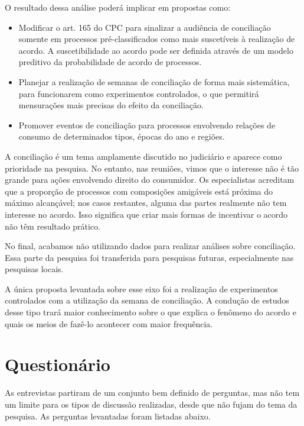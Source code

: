 \documentclass[]{report}
\providecommand{\tightlist}{%
  \setlength{\itemsep}{0pt}\setlength{\parskip}{0pt}}
\begin{document}
O resultado dessa análise poderá implicar em propostas como:

\begin{itemize}
\tightlist
\item
  Modificar o art. 165 do CPC para sinalizar a audiência de conciliação
  somente em processos pré-classificados como mais suscetíveis à
  realização de acordo. A suscetibilidade ao acordo pode ser definida
  através de um modelo preditivo da probabilidade de acordo de
  processos.
\item
  Planejar a realização de semanas de conciliação de forma mais
  sistemática, para funcionarem como experimentos controlados, o que
  permitirá mensurações mais precisas do efeito da conciliação.
\item
  Promover eventos de conciliação para processos envolvendo relações de
  consumo de determinados tipos, épocas do ano e regiões.
\end{itemize}

A conciliação é um tema amplamente discutido no judiciário e aparece
como prioridade na pesquisa. No entanto, nas reuniões, vimos que o
interesse não é tão grande para ações envolvendo direito do consumidor.
Os especialistas acreditam que a proporção de processos com composições
amigáveis está próxima do máximo alcançável; nos casos restantes, alguma
das partes realmente não tem interesse no acordo. Isso significa que
criar mais formas de incentivar o acordo não têm resultado prático.

No final, acabamos não utilizando dados para realizar análises sobre
conciliação. Essa parte da pesquisa foi transferida para pesquisas
futuras, especialmente nas pesquisas locais.

A única proposta levantada sobre esse eixo foi a realização de
experimentos controlados com a utilização da semana de conciliação. A
condução de estudos desse tipo trará maior conhecimento sobre o que
explica o fenômeno do acordo e quais os meios de fazê-lo acontecer com
maior frequência.

\section{Questionário}\label{questionario}

As entrevistas partiram de um conjunto bem definido de perguntas, mas
não tem um limite para os tipos de discussão realizadas, desde que não
fujam do tema da pesquisa. As perguntas levantadas foram listadas
abaixo.
\end{document}
